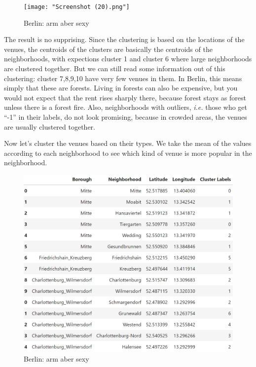\documentclass[11pt]{article}
\begin{document}
            \begin{figure}
\centering
\texttt{[image: "Screenshot (20).png"]}
\caption{Berlin: arm aber sexy}
\end{figure}


        
    The result is no supprising. Since the clustering is based on the
locations of the venues, the centroids of the clusters are basically the
centroids of the neighborhoods, with expections cluster 1 and cluster 6
where large neighborhoods are clustered together. But we can still read
some information out of this clustering: cluster 7,8,9,10 have very few
venues in them. In Berlin, this means simply that these are forests.
Living in forests can also be expensive, but you would not expect that
the rent rises sharply there, because forest stays as forest unless
there is a forest fire. Also, neighborhoods with outliers, \emph{i.e.}
those who get ``-1'' in their labels, do not look promising, because in
crowded areas, the venues are usually clustered together.

Now let's cluster the venues based on their types. We take the mean of the values according to each neighborhood to see
which kind of venue is more popular in the neighborhood.

 \begin{figure}
\centering
\includegraphics[scale=0.8]{"Screenshot (33).png"}
\caption{Berlin: arm aber sexy}
\end{figure}
\end{document}
